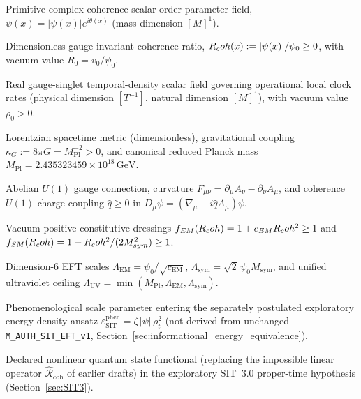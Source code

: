 \begin{description}[leftmargin=2.4cm, style=nextline]
  \item[$\psi(x)$] Primitive complex coherence scalar order-parameter field, $\psi(x) = |\psi(x)| e^{i\theta(x)}$ (mass dimension $[M]^1$).
  \item[$\Rcoh(x)$] Dimensionless gauge-invariant coherence ratio, $R_coh(x) := |\psi(x)|/\psi_0 \ge 0$, with vacuum value $R_0 = v_0/\psi_0$.
  \item[$\rho_t(x)$] Real gauge-singlet temporal-density scalar field governing operational local clock rates (physical dimension $[T^{-1}]$, natural dimension $[M]^1$), with vacuum value $\rho_0 > 0$.
  \item[$g_{\mu\nu},\,\kappa_G,\,M_{\mathrm{Pl}}$] Lorentzian spacetime metric (dimensionless), gravitational coupling $\kappa_G := 8\pi G = M_{\mathrm{Pl}}^{-2} > 0$, and canonical reduced Planck mass $M_{\mathrm{Pl}} = 2.435323459\times 10^{18}\,\mathrm{GeV}$.
  \item[$A_\mu,\,F_{\mu\nu},\,\hat{q}$] Abelian $U(1)$ gauge connection, curvature $F_{\mu\nu} = \partial_\mu A_\nu - \partial_\nu A_\mu$, and coherence $U(1)$ charge coupling $\hat{q} \ge 0$ in $D_\mu\psi = (\nabla_\mu - i\hat{q}A_\mu)\psi$.
  \item[$f_{\mathrm{EM}}(\Rcoh),\,f_{\mathrm{SM}}(\Rcoh)$] Vacuum-positive constitutive dressings $f_{EM}(R_coh) = 1 + c_{EM}R_coh^2 \ge 1$ and $f_{SM}(R_coh) = 1 + R_coh^2/(2 M_{sym}^2) \ge 1$.
  \item[$\Lambda_{\mathrm{EM}},\,\Lambda_{\mathrm{sym}},\,\Lambda_{\mathrm{UV}}$] Dimension-6 EFT scales $\Lambda_{\mathrm{EM}} = \psi_0/\sqrt{c_{\mathrm{EM}}}$, $\Lambda_{\mathrm{sym}} = \sqrt{2}\,\psi_0 M_{\mathrm{sym}}$, and unified ultraviolet ceiling $\Lambda_{\mathrm{UV}} = \min(M_{\mathrm{Pl}}, \Lambda_{\mathrm{EM}}, \Lambda_{\mathrm{sym}})$.
  \item[$\zeta$] Phenomenological scale parameter entering the separately postulated exploratory energy-density ansatz $\varepsilon_{\mathrm{SIT}}^{\mathrm{phen}} = \zeta\,|\psi|\,\rho_t^2$ (not derived from unchanged \texttt{M\_AUTH\_SIT\_EFT\_v1}, Section~\ref{sec:informational_energy_equivalence}).
  \item[{$\mathcal{C}_{\mathrm{state}}[\rho]$}] Declared nonlinear quantum state functional (replacing the impossible linear operator $\hat{\mathcal{R}}_{\mathrm{coh}}$ of earlier drafts) in the exploratory SIT~3.0 proper-time hypothesis (Section~\ref{sec:SIT3}).
\end{description}

